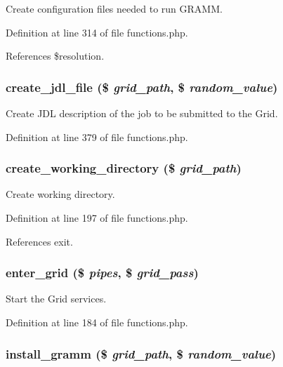 Create configuration files needed to run GRAMM. 



Definition at line 314 of file functions.php.

References \$resolution.
\subsubsection{\setlength{\rightskip}{0pt plus 5cm}create\_\-jdl\_\-file (\$ {\em grid\_\-path}, \$ {\em random\_\-value})}\label{functions_8php_a9}


Create JDL description of the job to be submitted to the Grid. 



Definition at line 379 of file functions.php.
\subsubsection{\setlength{\rightskip}{0pt plus 5cm}create\_\-working\_\-directory (\$ {\em grid\_\-path})}\label{functions_8php_a4}


Create working directory. 



Definition at line 197 of file functions.php.

References exit.
\subsubsection{\setlength{\rightskip}{0pt plus 5cm}enter\_\-grid (\$ {\em pipes}, \$ {\em grid\_\-pass})}\label{functions_8php_a3}


Start the Grid services. 



Definition at line 184 of file functions.php.
\subsubsection{\setlength{\rightskip}{0pt plus 5cm}install\_\-gramm (\$ {\em grid\_\-path}, \$ {\em random\_\-value})}\label{functions_8php_a2}


